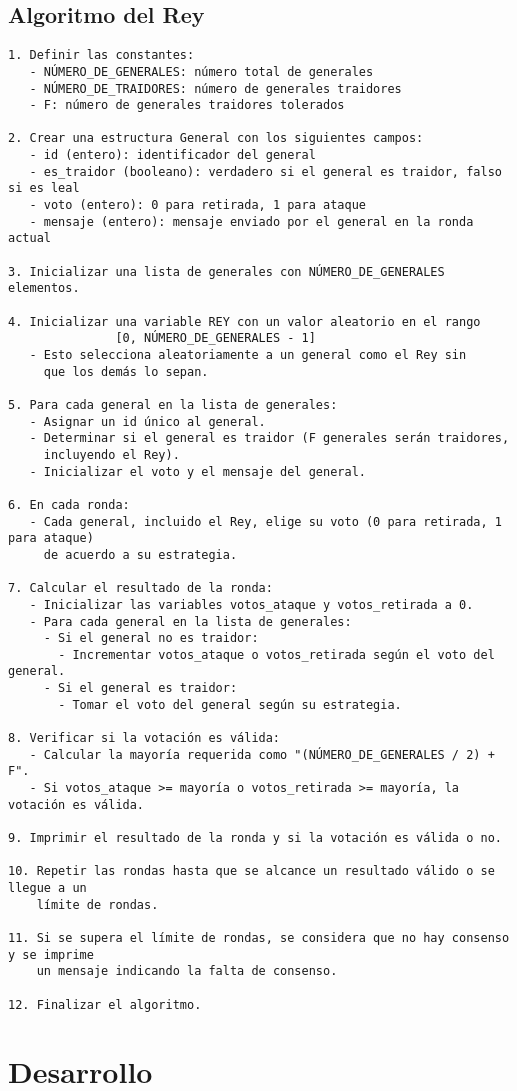 \documentclass[a4paper,12pt]{article}
\begin{document}
\subsection*{Algoritmo del Rey}
\begin{verbatim}
1. Definir las constantes:
   - NÚMERO_DE_GENERALES: número total de generales
   - NÚMERO_DE_TRAIDORES: número de generales traidores
   - F: número de generales traidores tolerados

2. Crear una estructura General con los siguientes campos:
   - id (entero): identificador del general
   - es_traidor (booleano): verdadero si el general es traidor, falso si es leal
   - voto (entero): 0 para retirada, 1 para ataque
   - mensaje (entero): mensaje enviado por el general en la ronda actual

3. Inicializar una lista de generales con NÚMERO_DE_GENERALES elementos.

4. Inicializar una variable REY con un valor aleatorio en el rango
               [0, NÚMERO_DE_GENERALES - 1]
   - Esto selecciona aleatoriamente a un general como el Rey sin 
     que los demás lo sepan.

5. Para cada general en la lista de generales:
   - Asignar un id único al general.
   - Determinar si el general es traidor (F generales serán traidores,
     incluyendo el Rey).
   - Inicializar el voto y el mensaje del general.

6. En cada ronda:
   - Cada general, incluido el Rey, elige su voto (0 para retirada, 1 para ataque) 
     de acuerdo a su estrategia.

7. Calcular el resultado de la ronda:
   - Inicializar las variables votos_ataque y votos_retirada a 0.
   - Para cada general en la lista de generales:
     - Si el general no es traidor:
       - Incrementar votos_ataque o votos_retirada según el voto del general.
     - Si el general es traidor:
       - Tomar el voto del general según su estrategia.

8. Verificar si la votación es válida:
   - Calcular la mayoría requerida como "(NÚMERO_DE_GENERALES / 2) + F".
   - Si votos_ataque >= mayoría o votos_retirada >= mayoría, la votación es válida.

9. Imprimir el resultado de la ronda y si la votación es válida o no.

10. Repetir las rondas hasta que se alcance un resultado válido o se llegue a un 
    límite de rondas.

11. Si se supera el límite de rondas, se considera que no hay consenso y se imprime
    un mensaje indicando la falta de consenso.

12. Finalizar el algoritmo.

\end{verbatim}

\section*{Desarrollo}
\end{document}
